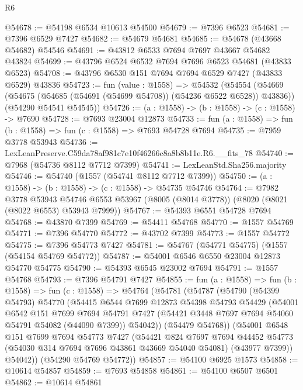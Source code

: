 \begin{lexlean}{R6}
\begin{coremodule}
@54678 := @54198 @6534 @10613 @54500
@54679 := @7396 @6523
@54681 := @7396 @6529 @7427
@54682 := @54679 @54681
@54685 := @54678 (@43668 @54682) @54546
@54691 := @43812 @6533 @7694 @7697 @43667 @54682 @43824
@54699 := @43796 @6524 @6532 @7694 @7696 @6523 @54681 (@43833 @6523)
@54708 := @43796 @6530 @151 @7694 @7694 @6529 @7427 (@43833 @6529) @43836
@54723 := fun (value : @1558) =>
  @54532
    (@54554
      (@54669 (@54675 (@54685 (@54691 (@54699 @54708)) (@54236 @6522 @6528)) @43836))
      (@54290 @54541 @54545))
@54726 := (a : @1558) -> (b : @1558) -> (c : @1558) -> @7690
@54728 := @7693 @23004 @12873
@54733 := fun (a : @1558) => fun (b : @1558) => fun (c : @1558) => @7693 @54728 @7694
@54735 := @7959 @3778 @53943
@54736 := LexLeanPreserve.C59da78af981c7e10f46266c8a8b8b11e.R6.__fits_78
@54740 := @7968 (@54736 @8112 @7712 @7399)
@54741 := LexLeanStd.Sha256.majority
@54746 := @54740 (@1557 (@54741 @8112 @7712 @7399))
@54750 := (a : @1558) -> (b : @1558) -> (c : @1558) -> @54735 @54746
@54764 := @7982
    @3778
    @53943
    @54746
    @6553
    @53967
    (@8005 (@8014 @3778))
    (@8020 (@8021 (@8022 @6553) @53943 @7999))
@54767 := @54393 @6551 @54728 @7694
@54768 := @43870 @7399
@54769 := @54411 @54768
@54770 := @1557 @54769
@54771 := @7396 @54770
@54772 := @43702 @7399
@54773 := @1557 @54772
@54775 := @7396 @54773 @7427
@54781 := @54767 (@54771 @54775) (@1557 (@54154 @54769 @54772))
@54787 := @54001 @6546 @6550 @23004 @12873 @54770 @54775
@54790 := @54393 @6545 @23002 @7694
@54791 := @1557 @54768
@54793 := @7396 @54791 @7427
@54855 := fun (a : @1558) =>
  fun (b : @1558) =>
  fun (c : @1558) =>
  @54764
    (@54781
      (@54787
        (@54790
          (@54399 @54793)
          @54770
          (@54415
            @6544
            @7699
            @12873
            @54398
            @54793
            @54429
            (@54001
              @6542
              @151
              @7699
              @7694
              @54791
              @7427
              (@54421 @3448 @7697 @7694 @54060 @54791 @54082 (@44090 @7399))
              @54042))
          (@54479 @54768))
        (@54001
          @6548
          @151
          @7699
          @7694
          @54773
          @7427
          (@54421
            @824
            @7697
            @7694
            @44452
            @54773
            (@54030 @314 @7694 @7696 @43861 @43669 @54040 @54081)
            (@43977 @7399))
          @54042))
      (@54290 @54769 @54772))
@54857 := @54100 @6925 @1573
@54858 := @10614 @54857
@54859 := @7693 @54858
@54861 := @54100 @6507 @6501
@54862 := @10614 @54861

\end{coremodule}
\end{lexlean}
